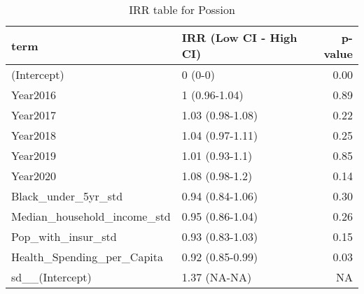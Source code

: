\documentclass[
]{article}
\newenvironment{Shaded}{\begin{snugshade}}{\end{snugshade}}
\newcommand{\AttributeTok}[1]{\textcolor[rgb]{0.13,0.29,0.53}{#1}}
\newcommand{\CommentTok}[1]{\textcolor[rgb]{0.56,0.35,0.01}{\textit{#1}}}
\newcommand{\DecValTok}[1]{\textcolor[rgb]{0.00,0.00,0.81}{#1}}
\newcommand{\FunctionTok}[1]{\textcolor[rgb]{0.13,0.29,0.53}{\textbf{#1}}}
\newcommand{\NormalTok}[1]{#1}
\newcommand{\OtherTok}[1]{\textcolor[rgb]{0.56,0.35,0.01}{#1}}
\newcommand{\SpecialCharTok}[1]{\textcolor[rgb]{0.81,0.36,0.00}{\textbf{#1}}}
\newcommand{\StringTok}[1]{\textcolor[rgb]{0.31,0.60,0.02}{#1}}
\begin{document}
\begin{Shaded}
\end{Shaded}

\begin{table}

\caption{\label{tab:unnamed-chunk-12}IRR table for Possion}
\centering
\begin{tabular}[t]{l|l|r}
\hline
term & IRR (Low CI - High CI) & p-value\\
\hline
(Intercept) & 0 (0-0) & 0.00\\
\hline
Year2016 & 1 (0.96-1.04) & 0.89\\
\hline
Year2017 & 1.03 (0.98-1.08) & 0.22\\
\hline
Year2018 & 1.04 (0.97-1.11) & 0.25\\
\hline
Year2019 & 1.01 (0.93-1.1) & 0.85\\
\hline
Year2020 & 1.08 (0.98-1.2) & 0.14\\
\hline
Black\_under\_5yr\_std & 0.94 (0.84-1.06) & 0.30\\
\hline
Median\_household\_income\_std & 0.95 (0.86-1.04) & 0.26\\
\hline
Pop\_with\_insur\_std & 0.93 (0.83-1.03) & 0.15\\
\hline
Health\_Spending\_per\_Capita & 0.92 (0.85-0.99) & 0.03\\
\hline
sd\_\_(Intercept) & 1.37 (NA-NA) & NA\\
\hline
\end{tabular}
\end{table}
\end{document}
